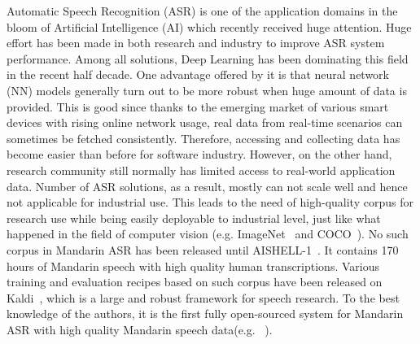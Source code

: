 \documentclass[a4paper]{article}
\begin{document}
Automatic Speech Recognition (ASR) is one of the application domains in the bloom of Artificial
Intelligence (AI) which recently received huge attention. Huge effort has been made in both research and industry
to improve ASR system performance. Among all solutions, Deep Learning has been dominating
this field in the recent half decade. One advantage offered by it is that neural network (NN) models generally turn out to be more robust when
huge amount of data is provided. This is good since thanks to the emerging market of various smart devices with rising online network usage, real data from
real-time scenarios can sometimes be fetched consistently. Therefore, accessing and 
collecting data has become easier than before for software industry.
However, on the other hand, research community still normally has limited access to real-world
application data. Number of ASR solutions, as a result, mostly can not scale well and hence not applicable for industrial use. This leads to the need of high-quality corpus for research use while being easily deployable to industrial level, just like what happened in the field of computer vision (e.g. ImageNet~\cite{imagenet} and COCO~\cite{coco}). No such corpus in Mandarin ASR has been released until AISHELL-1~\cite{aishell1}.
It contains 170 hours of Mandarin speech with high quality human transcriptions. 
Various training and evaluation recipes based on such corpus have been released on Kaldi~\cite{kaldi}, 
which is a large and robust framework for speech research. 
To the best knowledge of the authors, it is the first fully open-sourced system for Mandarin ASR with 
high quality Mandarin speech data(e.g. ~\cite{do2017, do2018_1, do2018_2}).

\end{document}
